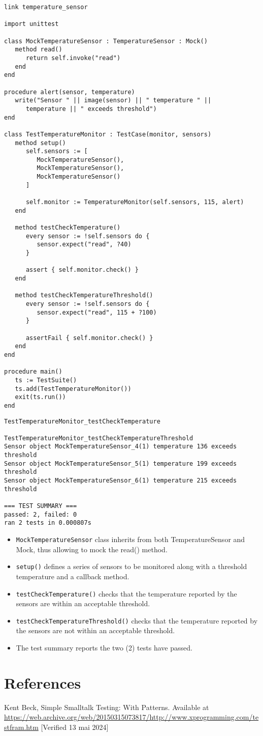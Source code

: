 \documentclass[letterpaper,12pt]{article}
\begin{document}
\bigskip{}
\begin{verbatim}
link temperature_sensor

import unittest

class MockTemperatureSensor : TemperatureSensor : Mock()
   method read()
      return self.invoke("read")
   end
end

procedure alert(sensor, temperature)
   write("Sensor " || image(sensor) || " temperature " || 
      temperature || " exceeds threshold")
end

class TestTemperatureMonitor : TestCase(monitor, sensors)
   method setup()
      self.sensors := [
         MockTemperatureSensor(),
         MockTemperatureSensor(),
         MockTemperatureSensor()
      ]

      self.monitor := TemperatureMonitor(self.sensors, 115, alert)
   end

   method testCheckTemperature()
      every sensor := !self.sensors do {
         sensor.expect("read", ?40)
      }

      assert { self.monitor.check() }
   end

   method testCheckTemperatureThreshold()
      every sensor := !self.sensors do {
         sensor.expect("read", 115 + ?100)
      }

      assertFail { self.monitor.check() }
   end
end

procedure main()
   ts := TestSuite()
   ts.add(TestTemperatureMonitor())
   exit(ts.run())
end
\end{verbatim}

\bigskip{}
\begin{verbatim}
TestTemperatureMonitor_testCheckTemperature

TestTemperatureMonitor_testCheckTemperatureThreshold
Sensor object MockTemperatureSensor_4(1) temperature 136 exceeds threshold
Sensor object MockTemperatureSensor_5(1) temperature 199 exceeds threshold
Sensor object MockTemperatureSensor_6(1) temperature 215 exceeds threshold

=== TEST SUMMARY ===
passed: 2, failed: 0
ran 2 tests in 0.000807s
\end{verbatim}

\begin{itemize}
   \item \texttt{MockTemperatureSensor} class inherits from both TemperatureSensor and Mock, thus allowing to mock the read() method.
   \item \texttt{setup()} defines a series of sensors to be monitored along with a threshold temperature and a callback method.
   \item \texttt{testCheckTemperature()} checks that the temperature reported by the sensors are within an acceptable threshold.
   \item \texttt{testCheckTemperatureThreshold()} checks that the temperature reported by the sensors are not within an acceptable threshold.
   \item The test summary reports the two (2) tests have passed.
\end{itemize}

\section*{References}

\noindent
[1] Kent Beck, Simple Smalltalk Testing: With Patterns. Available at \url{https://web.archive.org/web/20150315073817/http://www.xprogramming.com/testfram.htm} [Verified 13 mai 2024]
\end{document}
